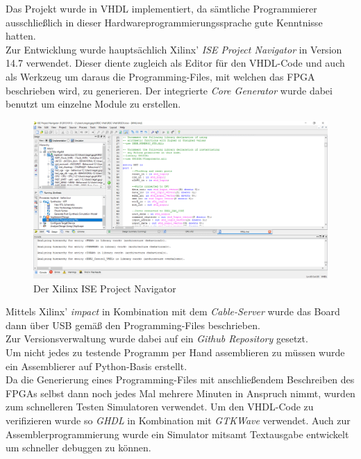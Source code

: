 Das Projekt wurde in VHDL implementiert, da s\"amtliche Programmierer ausschlie{\ss}lich in dieser Hardwareprogrammierungssprache gute Kenntnisse hatten.\\
Zur Entwicklung wurde haupts\"achlich Xilinx' \textit{ISE Project Navigator} in Version 14.7 verwendet. Dieser diente zugleich als Editor f\"ur den VHDL-Code und auch als Werkzeug um daraus die Programming-Files, mit welchen das FPGA beschrieben wird, zu generieren. Der integrierte \textit{Core Generator} wurde dabei benutzt um einzelne Module zu erstellen.\\
\begin{figure}[H]
	\centering
		\includegraphics[width=1.0\textwidth]{ISE.png}
	\caption{Der Xilinx ISE Project Navigator}
	\label{fig:tool}
\end{figure}
Mittels Xilinx' \textit{impact} in Kombination mit dem \textit{Cable-Server} wurde das Board dann \"uber USB gem\"a{\ss} den Programming-Files beschrieben.\\
Zur Versionsverwaltung wurde dabei auf ein \textit{Github Repository} gesetzt.\\ 
Um nicht jedes zu testende Programm per Hand assemblieren zu m\"ussen wurde ein Assemblierer auf Python-Basis erstellt.\\
Da die Generierung eines Programming-Files mit anschlie{\ss}endem Beschreiben des FPGAs selbst dann noch jedes Mal mehrere Minuten in Anspruch nimmt, wurden zum schnelleren Testen Simulatoren verwendet. Um den VHDL-Code zu verifizieren wurde so \textit{GHDL} in Kombination mit \textit{GTKWave} verwendet. Auch zur Assemblerprogrammierung wurde ein Simulator mitsamt Textausgabe entwickelt um schneller debuggen zu k\"onnen.
